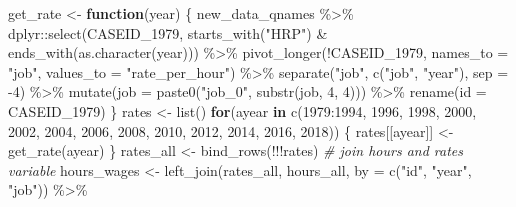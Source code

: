 \documentclass[12pt]{article}
\newenvironment{Shaded}{\begin{snugshade}}{\end{snugshade}}
\newcommand{\AttributeTok}[1]{\textcolor[rgb]{0.77,0.63,0.00}{#1}}
\newcommand{\CommentTok}[1]{\textcolor[rgb]{0.56,0.35,0.01}{\textit{#1}}}
\newcommand{\ControlFlowTok}[1]{\textcolor[rgb]{0.13,0.29,0.53}{\textbf{#1}}}
\newcommand{\DecValTok}[1]{\textcolor[rgb]{0.00,0.00,0.81}{#1}}
\newcommand{\FunctionTok}[1]{\textcolor[rgb]{0.00,0.00,0.00}{#1}}
\newcommand{\NormalTok}[1]{#1}
\newcommand{\OtherTok}[1]{\textcolor[rgb]{0.56,0.35,0.01}{#1}}
\newcommand{\SpecialCharTok}[1]{\textcolor[rgb]{0.00,0.00,0.00}{#1}}
\newcommand{\StringTok}[1]{\textcolor[rgb]{0.31,0.60,0.02}{#1}}
\begin{document}
\begin{Shaded}
\begin{Highlighting}[]
\NormalTok{get\_rate }\OtherTok{\textless{}{-}} \ControlFlowTok{function}\NormalTok{(year) \{}
\NormalTok{  new\_data\_qnames }\SpecialCharTok{\%\textgreater{}\%}
\NormalTok{    dplyr}\SpecialCharTok{::}\FunctionTok{select}\NormalTok{(CASEID\_1979,}
                  \FunctionTok{starts\_with}\NormalTok{(}\StringTok{"HRP"}\NormalTok{) }\SpecialCharTok{\&}
                    \FunctionTok{ends\_with}\NormalTok{(}\FunctionTok{as.character}\NormalTok{(year))) }\SpecialCharTok{\%\textgreater{}\%}
    \FunctionTok{pivot\_longer}\NormalTok{(}\SpecialCharTok{!}\NormalTok{CASEID\_1979, }\AttributeTok{names\_to =} \StringTok{"job"}\NormalTok{, }\AttributeTok{values\_to =} \StringTok{"rate\_per\_hour"}\NormalTok{) }\SpecialCharTok{\%\textgreater{}\%}
    \FunctionTok{separate}\NormalTok{(}\StringTok{"job"}\NormalTok{, }\FunctionTok{c}\NormalTok{(}\StringTok{"job"}\NormalTok{, }\StringTok{"year"}\NormalTok{), }\AttributeTok{sep =} \SpecialCharTok{{-}}\DecValTok{4}\NormalTok{) }\SpecialCharTok{\%\textgreater{}\%}
    \FunctionTok{mutate}\NormalTok{(}\AttributeTok{job =} \FunctionTok{paste0}\NormalTok{(}\StringTok{"job\_0"}\NormalTok{, }\FunctionTok{substr}\NormalTok{(job, }\DecValTok{4}\NormalTok{, }\DecValTok{4}\NormalTok{))) }\SpecialCharTok{\%\textgreater{}\%}
    \FunctionTok{rename}\NormalTok{(}\AttributeTok{id =}\NormalTok{ CASEID\_1979)}
\NormalTok{\}}
\NormalTok{rates }\OtherTok{\textless{}{-}} \FunctionTok{list}\NormalTok{()}
\ControlFlowTok{for}\NormalTok{(ayear }\ControlFlowTok{in} \FunctionTok{c}\NormalTok{(}\DecValTok{1979}\SpecialCharTok{:}\DecValTok{1994}\NormalTok{, }\DecValTok{1996}\NormalTok{, }\DecValTok{1998}\NormalTok{, }\DecValTok{2000}\NormalTok{, }\DecValTok{2002}\NormalTok{, }\DecValTok{2004}\NormalTok{, }\DecValTok{2006}\NormalTok{, }\DecValTok{2008}\NormalTok{, }\DecValTok{2010}\NormalTok{,}
               \DecValTok{2012}\NormalTok{, }\DecValTok{2014}\NormalTok{, }\DecValTok{2016}\NormalTok{, }\DecValTok{2018}\NormalTok{)) \{}
\NormalTok{  rates[[ayear]] }\OtherTok{\textless{}{-}} \FunctionTok{get\_rate}\NormalTok{(ayear)}
\NormalTok{\}}
\NormalTok{rates\_all }\OtherTok{\textless{}{-}} \FunctionTok{bind\_rows}\NormalTok{(}\SpecialCharTok{!!!}\NormalTok{rates)}
\CommentTok{\# join hours and rates variable}
\NormalTok{hours\_wages }\OtherTok{\textless{}{-}} \FunctionTok{left\_join}\NormalTok{(rates\_all,}
\NormalTok{                         hours\_all,}
                         \AttributeTok{by =} \FunctionTok{c}\NormalTok{(}\StringTok{"id"}\NormalTok{, }\StringTok{"year"}\NormalTok{, }\StringTok{"job"}\NormalTok{)) }\SpecialCharTok{\%\textgreater{}\%}

\end{Highlighting}
\end{Shaded}
\end{document}
